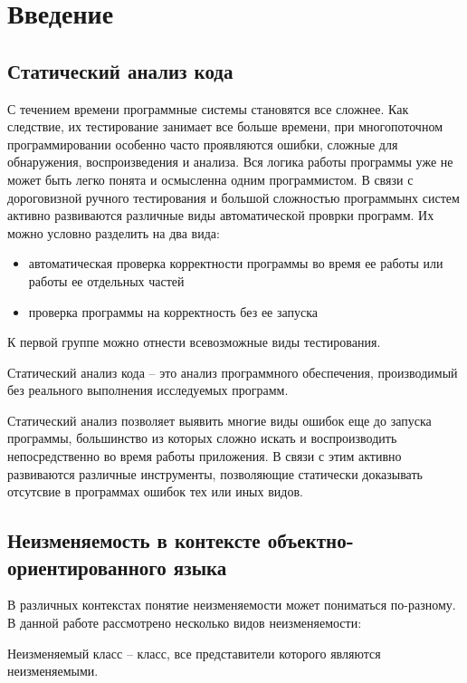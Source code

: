 \chapter{Введение}

\section{Статический анализ кода}

С течением времени программные системы становятся все сложнее. Как следствие, их тестирование занимает все больше времени, при многопоточном программировании особенно часто проявляются ошибки, сложные для обнаружения, воспроизведения и анализа. Вся логика работы программы уже не может быть легко понята и осмысленна одним программистом. В связи с дороговизной ручного тестирования и большой сложностью программынх систем активно развиваются различные виды автоматической проврки программ. Их можно условно разделить на два вида:
\begin{itemize}
\item автоматическая проверка корректности программы во время ее работы или работы ее отдельных частей
\item проверка программы на корректность без ее запуска
\end{itemize}

К первой группе можно отнести всевозможные виды тестирования. 

\begin{Def}\label{static_program_analysis}
Статический анализ кода -- это анализ программного обеспечения, производимый без реального выполнения исследуемых программ.
\end{Def}

Статический анализ позволяет выявить многие виды ошибок еще до запуска программы, большинство из которых сложно искать и воспроизводить непосредственно во время работы приложения. В связи с этим активно развиваются различные инструменты, позволяющие статически доказывать отсутсвие в программах ошибок тех или иных видов.  

\section{Неизменяемость в контексте объектно-ориентированного языка}

В различных контекстах понятие неизменяемости может пониматься по-разному. В данной работе рассмотрено несколько видов неизменяемости:

\begin{Def}\label{immutabule_class}
Неизменяемый класс -- класс, все представители которого являются неизменяемыми. 
\end{Def}

